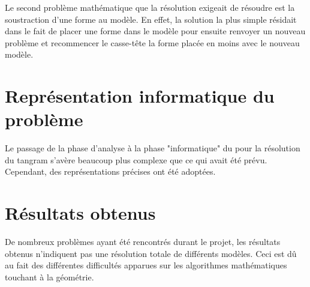 \documentclass[a4paper, 11pt]{report}
\begin{document}
		Le second problème mathématique que la résolution exigeait de résoudre est la soustraction d'une forme au modèle. En effet, la solution la plus simple résidait dans le fait de placer une forme dans le modèle pour ensuite renvoyer un nouveau problème et recommencer le casse-t\^ete la forme placée en moins avec le nouveau modèle.
	
	
	\newpage
	
	\chapter{Représentation informatique du problème}
	
	Le passage de la phase d'analyse à la phase "informatique" du pour la résolution du tangram s'avère beaucoup plus complexe que ce qui avait été prévu. Cependant, des représentations précises ont été adoptées.
	
	\chapter{Résultats obtenus}
	
	De nombreux problèmes ayant été rencontrés durant le projet, les résultats obtenus n'indiquent pas une résolution totale de différents modèles. Ceci est d\^u au fait des différentes difficultés apparues sur les algorithmes mathématiques touchant à la géométrie.
	
	
		
	\newpage	
		
	\tableofcontents
		
\end{document}
